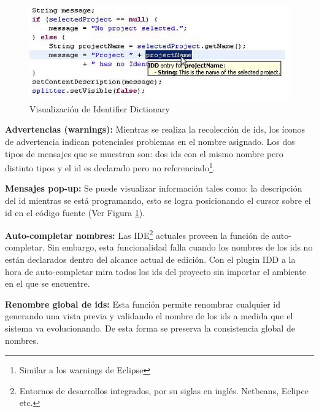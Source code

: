 \begin{figure}[t] %
\centerline{%
\includegraphics[scale= 0.70]{./cap3/idd_7.png}
}
\caption{Visualización de Identifier Dictionary}
\label{captura8}
\end{figure}

\textbf{Advertencias (warnings):} Mientras se realiza la recolección de ids, los íconos de advertencia indican potenciales problemas en el nombre asignado.  Los dos tipos de mensajes que se muestran son: dos ids con el mismo nombre pero distinto tipos y el id es declarado pero no referenciado\footnote[1]{Similar a los warnings de Eclipse}.


\textbf{Mensajes pop-up:} Se puede visualizar información tales como: la descripción del id mientras se está programando, esto se logra posicionando el cursor sobre el id en el código fuente (Ver Figura \ref{captura8}).

\textbf{Auto-completar nombres:} Las IDE\footnote[2]{Entornos de desarrollos integrados, por su siglas en inglés. Netbeans, Eclipce etc.} actuales proveen la función de auto-completar.
Sin embargo, esta funcionalidad falla cuando los nombres de los ids no están declarados dentro del alcance actual de edición. Con el plugin IDD a la hora de auto-completar mira todos los ids del proyecto sin importar el ambiente en el que se encuentre.

\textbf{Renombre global de ids:} Esta función permite renombrar cualquier id generando una vista previa y validando el nombre de los ids a medida que el sistema va evolucionando. De esta forma se preserva la consistencia global de nombres.

